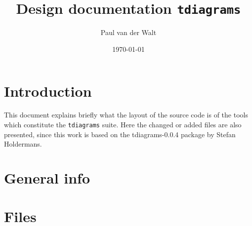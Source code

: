 \documentclass[a4paper]{article}
\title{Design documentation \texttt{tdiagrams}}
\date{\today}
\author{Paul van der Walt}
\begin{document}
\maketitle

\section{Introduction}

This document explains briefly what the layout of the source code is of the tools which constitute the \texttt{tdiagrams} suite. Here the changed or added files are also presented, since this work is based on the tdiagrams-0.0.4 package by Stefan Holdermans. 

\section{General info}



\section{Files}
\end{document}
